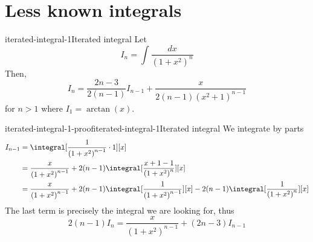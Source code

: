 \documentclass[preview]{standalone}
\begin{document}
\section{Less known integrals}

\begin{snippetproposition}{iterated-integral-1}{Iterated integral}
    Let
    \[
        I_n = \int \frac{dx}{{(1+x^2)}^n}
    \]
    Then,
    \[
        I_n = \frac{2n-3}{2(n-1)}I_{n-1} + \frac{x}{2(n-1){(x^2 + 1)}^{n-1}}
    \]
    for \(n>1\) where \(I_1 = \arctan(x)\).
\end{snippetproposition}

\begin{snippetproof}{iterated-integral-1-proof}{iterated-integral-1}{Iterated integral}
    We integrate by parts
    \begin{align*}
        I_{n-1} &= \integral[\frac{1}{{(1 + x^2)}^{n-1}} \cdot 1][x] \\
        &= \frac{x}{{(1+x^2)}^{n-1}} + 2(n-1) \integral[\frac{x + 1 - 1}{{(1 + x^2)}^n}][x] \\
        &= \frac{x}{{(1+x^2)}^{n-1}} + 2(n-1) \integral[\frac{1}{{(1 + x^2)}^{n-1}}][x]
        - 2(n-1) \integral[\frac{1}{{(1 + x^2)}^n}][x]
    \end{align*}
    The last term is precisely the integral we are looking for, thus
    \[
        2(n-1) I_n = \frac{x}{{(1 + x^2)}^{n-1}} + (2n-3)I_{n-1}
    \]
\end{snippetproof}
\end{document}
